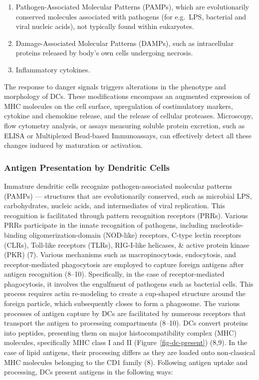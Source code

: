 \documentclass[
]{article}
\begin{document}
\begin{enumerate}
\def\labelenumi{\arabic{enumi}.}
\item
  Pathogen-Associated Molecular Patterns (PAMPs), which are
  evolutionarily conserved molecules associated with pathogens (for
  e.g.~LPS, bacterial and viral nucleic acids), not typically found
  within eukaryotes.
\item
  Damage-Associated Molecular Patterns (DAMPs), such as intracellular
  proteins released by body's own cells undergoing necrosis.
\item
  Inflammatory cytokines.
\end{enumerate}

The response to danger signals triggers alterations in the phenotype and
morphology of DCs. These modifications encompass an augmented expression
of MHC molecules on the cell surface, upregulation of costimulatory
markers, cytokine and chemokine release, and the release of cellular
proteases. Microscopy, flow cytometry analysis, or assays measuring
soluble protein excretion, such as ELISA or Multiplexed Bead-based
Immunoassays, can effectively detect all these changes induced by
maturation or activation.

\subsubsection{Antigen Presentation by Dendritic
Cells}\label{antigen-presentation-by-dendritic-cells}

Immature dendritic cells recognize pathogen-associated molecular
patterns (PAMPs) --- structures that are evolutionarily conserved, such
as microbial LPS, carbohydrates, nucleic acids, and intermediates of
viral replication. This recognition is facilitated through pattern
recognition receptors (PRRs). Various PRRs participate in the innate
recognition of pathogens, including nucleotide-binding
oligomerization-domain (NOD-like) receptors, C-type lectin receptors
(CLRs), Toll-like receptors (TLRs), RIG-I-like helicases, \& active
protein kinase (PKR) (7). Various mechanisms such as macropinocytosis,
endocytosis, and receptor-mediated phagocytosis are employed to capture
foreign antigens after antigen recognition (8--10). Specifically, in the
case of receptor-mediated phagocytosis, it involves the engulfment of
pathogens such as bacterial cells. This process requires actin
re-modeling to create a cup-shaped structure around the foreign
particle, which subsequently closes to form a phagosome. The various
processes of antigen capture by DCs are facilitated by numerous
receptors that transport the antigen to processing compartments (8--10).
DCs convert proteins into peptides, presenting them on major
histocompatibility complex (MHC) molecules, specifically MHC class I and
II (Figure~\ref{fig-dc-present}) (8,9). In the case of lipid antigens,
their processing differs as they are loaded onto non-classical MHC
molecules belonging to the CD1 family (8). Following antigen uptake and
processing, DCs present antigens in the following ways:
\end{document}
